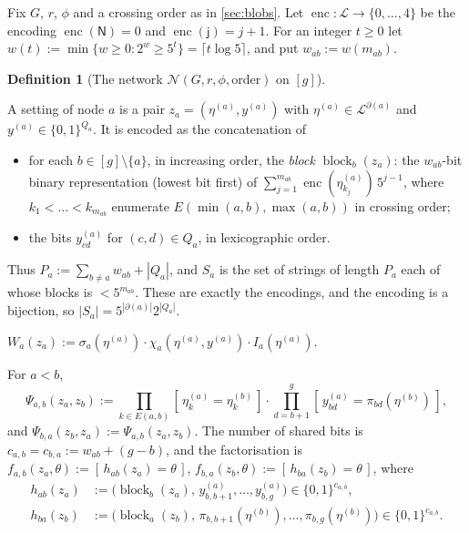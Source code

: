 \documentclass[11pt]{amsart}
\theoremstyle{plain}
\theoremstyle{definition}
\newtheorem{definition}[theorem]{Definition}
\theoremstyle{remark}
\numberwithin{equation}{section}
\newcommand{\cL}{\mathcal{L}}
\newcommand{\lab}[1]{\mathsf{#1}}
\newcommand{\enc}{\operatorname{enc}}
\newcommand{\block}{\operatorname{block}}
\newcommand{\Ind}[1]{[\,#1\,]}
\begin{document}
Fix $G$, $r$, $\phi$ and a crossing order as in \cref{sec:blobs}. Let
$\enc\colon\cL\to\{0,\dots,4\}$ be the encoding $\enc(\lab N)=0$ and $\enc(\lab j)=j+1$. For an
integer $t\ge0$ let $w(t):=\min\{w\ge0 : 2^w\ge 5^t\}=\lceil t\log 5\rceil$, and put
$w_{ab}:=w(m_{ab})$.

\begin{definition}[{The network $\mathcal N(G,r,\phi,\text{order})$ on $[g]$}]\label{def:our-network}
\leavevmode
\begin{description}[leftmargin=0pt,font=\normalfont\itshape]
\item[Settings.] A setting of node $a$ is a pair $z_a=(\eta^{(a)},y^{(a)})$ with
$\eta^{(a)}\in\cL^{\partial(a)}$ and $y^{(a)}\in\{0,1\}^{Q_a}$. It is encoded as the
concatenation of
\begin{itemize}
\item for each $b\in[g]\setminus\{a\}$, in increasing order, the \emph{block} $\block_b(z_a)$:
the $w_{ab}$-bit binary representation (lowest bit first) of
$\sum_{j=1}^{m_{ab}}\enc(\eta^{(a)}_{k_j})\,5^{j-1}$, where $k_1<\dots<k_{m_{ab}}$ enumerate
$E(\min(a,b),\max(a,b))$ in crossing order;
\item the bits $y^{(a)}_{cd}$ for $(c,d)\in Q_a$, in lexicographic order.
\end{itemize}
Thus $P_a:=\sum_{b\ne a}w_{ab}+|Q_a|$, and $S_a$ is the set of strings of length $P_a$ each of
whose blocks is $<5^{m_{ab}}$. These are exactly the encodings, and the encoding is a bijection,
so $|S_a|=5^{|\partial(a)|}2^{|Q_a|}$.
\item[Node functions.] $W_a(z_a):=\sigma_a(\eta^{(a)})\cdot\chi_a(\eta^{(a)},y^{(a)})\cdot
I_a(\eta^{(a)})$.
\item[Edges.] For $a<b$,
\[
  \Psi_{a,b}(z_a,z_b):=\prod_{k\in E(a,b)}\Ind{\eta^{(a)}_k=\eta^{(b)}_k}\cdot
  \prod_{d=b+1}^{g}\Ind{y^{(a)}_{bd}=\pi_{bd}(\eta^{(b)})},
\]
and $\Psi_{b,a}(z_b,z_a):=\Psi_{a,b}(z_a,z_b)$. The number of shared bits is
$c_{a,b}=c_{b,a}:=w_{ab}+(g-b)$, and the factorisation is $f_{a,b}(z_a,\theta):=
\Ind{h_{ab}(z_a)=\theta}$, $f_{b,a}(z_b,\theta):=\Ind{h_{ba}(z_b)=\theta}$, where
\begin{align*}
  h_{ab}(z_a)&:=\bigl(\block_b(z_a),\,y^{(a)}_{b,b+1},\dots,y^{(a)}_{b,g}\bigr)\in\{0,1\}^{c_{a,b}},\\
  h_{ba}(z_b)&:=\bigl(\block_a(z_b),\,\pi_{b,b+1}(\eta^{(b)}),\dots,\pi_{b,g}(\eta^{(b)})\bigr)\in\{0,1\}^{c_{a,b}}.
\end{align*}
\end{description}
\end{definition}
\end{document}
